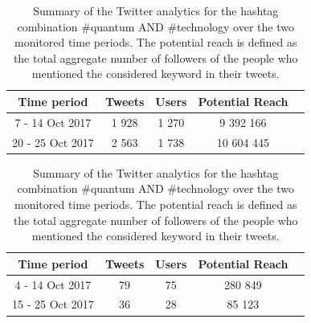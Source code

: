\begin{table}[t]
 \begin{center}
 
  \begin{tabular}{ccccc}
   \hline 
   \hline
   Time period & Tweets & Users & Potential Reach \\ 
   \hline
   \hline
   7 - 14 Oct 2017 & 1 928 & 1 270 & 9 392 166  \\
   20 - 25 Oct 2017 & 2 563 & 1 738 & 10 604 445  \\
   \hline
   \hline
  \end{tabular}

  \bigskip

  \begin{tabular}{ccccc}
   \hline 
   \hline
   Time period & Tweets & Users & Potential Reach \\ 
   \hline
   \hline
   4 - 14 Oct 2017 & 79 & 75 & 280 849  \\
   15 - 25 Oct 2017 & 36 & 28 & 85 123  \\
   \hline
   \hline
  \end{tabular}
 \end{center} 
 \caption{Summary of the Twitter analytics for the hashtag combination \#quantum AND \#technology over the two monitored time periods. The potential reach is defined as the total aggregate number of followers of the people who mentioned the considered keyword in their tweets.}
\label{Summary_QuantumComputing-Technology} 
\end{table}    

